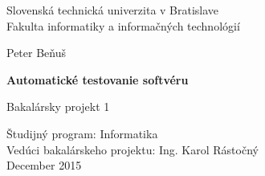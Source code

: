 \documentclass[11pt,twoside,slovak,a4paper]{article}
\begin{document}
	
	\begin{titlepage}
		\newlength{\myind}
		\addtolength{\myind}{57mm}
		
		\newlength{\myrulelength}
		\addtolength{\myrulelength}{\textwidth}
		\newcommand{\myrule}{\parbox{\myrulelength}{\hrulefill}}
		\newcommand{\mybox}[1]{\parbox{\myrulelength}{#1}}
		\newcommand{\mycbox}[1]{\parbox{\myrulelength}{\centering #1}}
		
		\begin{center}
			\large 		Slovenská technická univerzita v Bratislave\\
			Fakulta informatiky a informačných technológií	
		\end{center}

		
		\vspace{4mm}
		\myrule
		
		\vspace{55mm}
		
		\mycbox{Peter Beňuš}
		
		\vspace{10mm}
		
		\mycbox{\LARGE \textbf{Automatické testovanie softvéru}}
		
		\vspace{4mm}
		\mycbox{\large Bakalársky projekt 1}
		
		
		\vfill
		\begin{flushleft}
			Študijný program: Informatika\\
			Vedúci bakalárskeho projektu: Ing. Karol Rástočný\\
			December 2015
		\end{flushleft}
	\end{titlepage}
	
\end{document}
